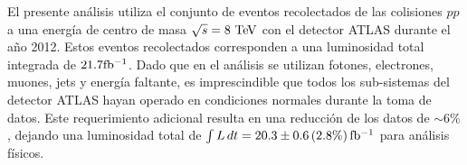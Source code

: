





El presente análisis utiliza el conjunto de eventos recolectados de las colisiones
$pp$ a una energía de centro de masa $\sqrt{s} = 8\tev$ con el detector ATLAS
durante el a\~no 2012. Estos eventos recolectados corresponden a una luminosidad
total integrada de $21.7 \mbox{fb$^{-1}$}$. Dado que en el análisis se utilizan fotones, electrones,
muones, jets y energía faltante, es imprescindible que todos los sub-sistemas
del detector ATLAS hayan operado en condiciones normales durante la toma
de datos. Este requerimiento adicional resulta en una reducción de los datos de
$\sim 6\%$, dejando una luminosidad total de $\int L\, dt = 20.3 \pm 0.6\, (2.8
\%) \, \mbox{fb$^{-1}$}$\cite{lumi2012} para análisis físicos.

